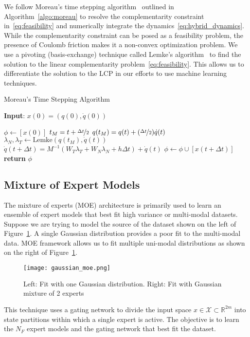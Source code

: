 We follow Moreau's time stepping algorithm~\cite{glocker2005formulation}
outlined in Algorithm~\eqref{algo:moreau} to resolve the complementarity
constraint in~\eqref{eq:feasibility} and numerically integrate the
dynamics~\eqref{eq:hybrid_dynamics}. While the complementarity constraint can be
posed as a feasibility problem, the presence of Coulomb friction makes it a
non-convex optimization problem. We use a pivoting (basis-exchange) technique
called Lemke's algorithm~\cite{acary2008numerical} to find the solution to the
linear complementarity problem~\eqref{eq:feasibility}. This allows us to
differentiate the solution to the LCP in our efforts to use machine learning
techniques.

\begin{algorithm}[H]
    \caption{Moreau's Time Stepping Algorithm}
    \label{algo:moreau}
    \small
    \hspace*{\algorithmicindent} \textbf{Input}: $x(0) = (q(0), \dot{q}(0))$
    \begin{algorithmic}[1]
      \State $\phi \leftarrow  [x(0)]$ 
            \State $t_M = t + \nicefrac{\Delta t}{2}$
            \State $q(t_M) = q(t) +  (\nicefrac{\Delta t}{2}) \dot{q}(t) $
            \State $\lambda_N, \lambda_T \leftarrow \text{Lemke}(q(t_M), \dot{q}(t))$ 
            \State $\dot{q}(t+\Delta t) = M^{-1}(W_T \lambda_T + W_N \lambda_N + h\Delta t) + \dot{q}(t)$
            \State $\phi \leftarrow \phi \cup [x(t+\Delta t)]$
          \EndFor
        \State \textbf{return} $\phi$
    \end{algorithmic}
\end{algorithm}


\subsection{Mixture of Expert Models}
\label{ssec:mixture_of_experts}

The mixture of experts (MOE) architecture is primarily used to learn an ensemble
of expert models that best fit high variance or multi-modal datasets.
%
Suppose we are trying to model the source of the dataset shown on the left of
Figure~\ref{fig:gaussian_moe}.
%
A single Gaussian distribution provides a poor fit to the multi-modal data.
%
MOE framework allows us to fit multiple uni-modal distributions as shown on
the right of Figure~\ref{fig:gaussian_moe}.
\begin{figure}[tb]
  \centering
  \texttt{[image: gaussian\_moe.png]}
  \caption{Left: Fit with one Gaussian distribution. Right: Fit with Gaussian
  mixture of 2 experts~\cite{mcgonagle_dobre_pilling}}
  \label{fig:gaussian_moe}
\end{figure}
%
This technique uses a gating network to divide the input space $x \in
\mathcal{X} \subset \mathbb{R}^{2m}$ into state partitions within which a single
expert is active.
%
The objective is to learn the $N_F$ expert models and the gating network that
best fit the dataset.
%

